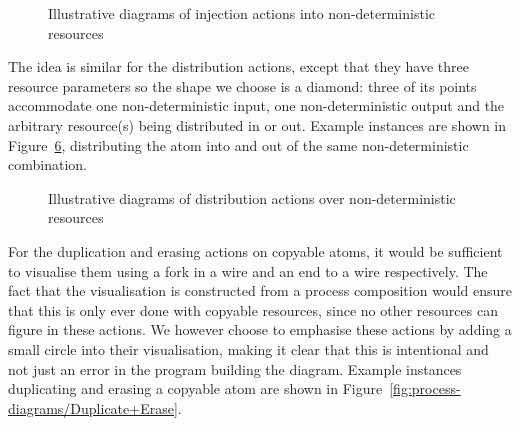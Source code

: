 \documentclass[class=smolathesis,crop=false]{standalone}
\begin{document}
\begin{figure}[h]
  \begin{subfigure}{0.49\textwidth}
    \centering
    
    \caption{}
    \label{fig:process-diagrams/InjectL}
  \end{subfigure}
  \begin{subfigure}{0.49\textwidth}
    \centering
    
    \caption{}
    \label{fig:process-diagrams/InjectR}
  \end{subfigure}
  \caption{Illustrative diagrams of injection actions into non-deterministic resources}
    \label{fig:process-diagrams/Inject}
\end{figure}

\cbstart
The idea is similar for the distribution actions, except that they have three resource parameters so the shape we choose is a diamond: three of its points accommodate one non-deterministic input, one non-deterministic output and the arbitrary resource(s) being distributed in or out.
Example instances are shown in Figure~\ref{fig:process-diagrams/OptDistr}, distributing the atom  into and out of the same non-deterministic combination.
\cbend

\begin{figure}[h]
  \begin{subfigure}{0.49\textwidth}
    \centering
    
    \caption{}
    \label{fig:process-diagrams/OptDistrIn}
  \end{subfigure}
  \begin{subfigure}{0.49\textwidth}
    \centering
    
    \caption{}
    \label{fig:process-diagrams/OptDistrOut}
  \end{subfigure}
  \caption{Illustrative diagrams of distribution actions over non-deterministic resources}
    \label{fig:process-diagrams/OptDistr}
\end{figure}

\cbstart
For the duplication and erasing actions on copyable atoms, it would be sufficient to visualise them using a fork in a wire and an end to a wire respectively.
The fact that the visualisation is constructed from a process composition would ensure that this is only ever done with copyable resources, since no other resources can figure in these actions.
We however choose to emphasise these actions by adding a small circle into their visualisation, making it clear that this is intentional and not just an error in the program building the diagram.
Example instances duplicating and erasing a copyable atom  are shown in Figure~\ref{fig:process-diagrams/Duplicate+Erase}.
\cbend
\end{document}
